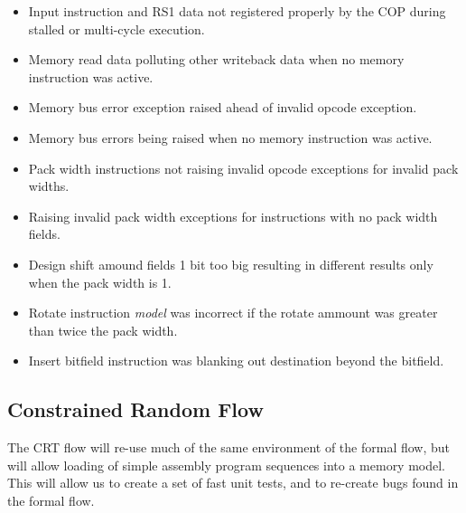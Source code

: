 \begin{itemize}
\item Input instruction and RS1 data not registered properly by the COP during
    stalled or multi-cycle execution.
\item Memory read data polluting other writeback data when no memory instruction
    was active.
\item Memory bus error exception raised ahead of invalid opcode exception.
\item Memory bus errors being raised when no memory instruction was active.
\item Pack width instructions not raising invalid opcode exceptions for
    invalid pack widths.
\item Raising invalid pack width exceptions for instructions with no pack width
    fields.
\item Design shift amound fields 1 bit too big resulting in different results only
    when the pack width is 1.
\item Rotate instruction {\em model} was incorrect if the rotate ammount was
    greater than twice the pack width.
\item Insert bitfield instruction was blanking out destination beyond the
    bitfield.
\end{itemize}

\subsection{Constrained Random Flow}

The CRT flow will re-use much of the same environment of the formal flow,
but will allow loading of simple assembly program sequences into a
memory model. This will allow us to create a set of fast unit tests, and to
re-create bugs found in the formal flow.

